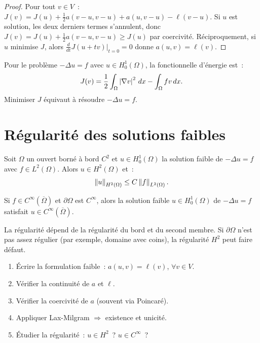 \begin{proof}
Pour tout $v \in V$~:
$J(v) = J(u) + \frac{1}{2}a(v - u, v - u) + a(u, v - u) - \ell(v - u)$.
Si $u$ est solution, les deux derniers termes s'annulent, donc
$J(v) = J(u) + \frac{1}{2}a(v-u, v-u) \geq J(u)$ par coercivit\'e.
R\'eciproquement, si $u$ minimise $J$, alors $\frac{d}{dt}J(u + tv)|_{t=0} = 0$
donne $a(u,v) = \ell(v)$.
\end{proof}

\begin{exemple}
Pour le probl\`eme $-\Delta u = f$ avec $u \in H_0^1(\Omega)$, la fonctionnelle
d'\'energie est~:
\[
    J(v) = \frac{1}{2}\int_\Omega \left| \nabla v \right|^2\, dx - \int_\Omega f v\, dx.
\]
Minimiser $J$ \'equivaut \`a r\'esoudre $-\Delta u = f$.
\end{exemple}

\section{R\'egularit\'e des solutions faibles}

\begin{theoreme}[R\'egularit\'e $H^2$]
\label{thm:regularite_H2}
Soit $\Omega$ un ouvert born\'e \`a bord $C^2$ et $u \in H_0^1(\Omega)$ la solution
faible de $-\Delta u = f$ avec $f \in L^2(\Omega)$. Alors $u \in H^2(\Omega)$
et~:
\[
    \left\| u \right\|_{H^2(\Omega)} \leq C\left\| f \right\|_{L^2(\Omega)}.
\]
\end{theoreme}

\begin{theoreme}
Si $f \in C^\infty(\overline{\Omega})$ et $\partial\Omega$ est $C^\infty$, alors
la solution faible $u \in H_0^1(\Omega)$ de $-\Delta u = f$ satisfait
$u \in C^\infty(\overline{\Omega})$.
\end{theoreme}

\begin{remarque}
La r\'egularit\'e d\'epend de la r\'egularit\'e du bord et du second membre. Si
$\partial\Omega$ n'est pas assez r\'egulier (par exemple, domaine avec coins),
la r\'egularit\'e $H^2$ peut faire d\'efaut.
\end{remarque}

\begin{formules}[title=\textbf{R\'esum\'e de la m\'ethode variationnelle}]
\begin{enumerate}
    \item \'Ecrire la formulation faible~: $a(u,v) = \ell(v)$, $\forall v \in V$.
    \item V\'erifier la continuit\'e de $a$ et $\ell$.
    \item V\'erifier la coercivit\'e de $a$ (souvent via Poincar\'e).
    \item Appliquer Lax-Milgram $\Rightarrow$ existence et unicit\'e.
    \item \'Etudier la r\'egularit\'e~: $u \in H^2$~? $u \in C^\infty$~?
\end{enumerate}
\end{formules}

